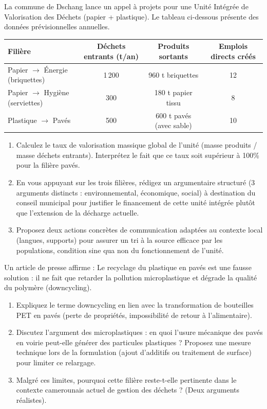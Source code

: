 \documentclass[11pt]{article}
\begin{document}
\begin{exercice}
La commune de Dschang lance un appel à projets pour une \og Unité Intégrée de Valorisation des Déchets\fg{} (papier + plastique). Le tableau ci-dessous présente des données prévisionnelles annuelles.

\begin{tabularx}{\linewidth}{lccc}
\toprule
\textbf{Filière} & \textbf{Déchets entrants (t/an)} & \textbf{Produits sortants} & \textbf{Emplois directs créés} \\
\midrule
Papier $\rightarrow$ Énergie (briquettes) & 1\,200 & 960 t briquettes & 12 \\
Papier $\rightarrow$ Hygiène (serviettes) & 300 & 180 t papier tissu & 8 \\
Plastique $\rightarrow$ Pavés & 500 & 600 t pavés (avec sable) & 10 \\
\bottomrule
\end{tabularx}

\begin{enumerate}
    \item Calculez le taux de valorisation massique global de l'unité (masse produits / masse déchets entrants). Interprétez le fait que ce taux soit supérieur à 100\% pour la filière pavés.
    \item En vous appuyant sur les trois filières, rédigez un argumentaire structuré (3 arguments distincts : environnemental, économique, social) à destination du conseil municipal pour justifier le financement de cette unité intégrée plutôt que l'extension de la décharge actuelle.
    \item Proposez deux actions concrètes de communication adaptées au contexte local (langues, supports) pour assurer un tri à la source efficace par les populations, condition sine qua non du fonctionnement de l'unité.
\end{enumerate}
\end{exercice}

\begin{exercice}
Un article de presse affirme : \og Le recyclage du plastique en pavés est une fausse solution : il ne fait que retarder la pollution microplastique et dégrade la qualité du polymère (downcycling).\fg{}
\begin{enumerate}
    \item Expliquez le terme \og downcycling\fg{} en lien avec la transformation de bouteilles PET en pavés (perte de propriétés, impossibilité de retour à l'alimentaire).
    \item Discutez l'argument des microplastiques : en quoi l'usure mécanique des pavés en voirie peut-elle générer des particules plastiques ? Proposez une mesure technique lors de la formulation (ajout d'additifs ou traitement de surface) pour limiter ce relargage.
    \item Malgré ces limites, pourquoi cette filière reste-t-elle pertinente dans le contexte camerounais actuel de gestion des déchets ? (Deux arguments réalistes).
\end{enumerate}
\end{exercice}
\end{document}
